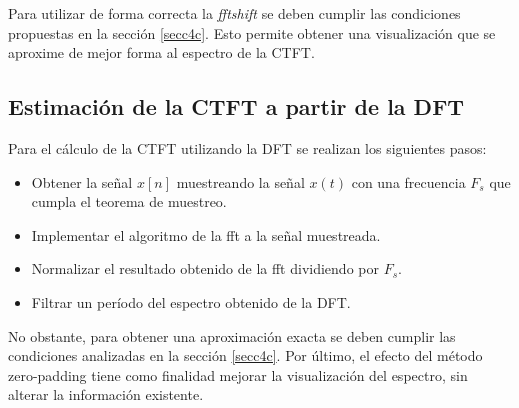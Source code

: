 \documentclass[11pt,a4paper]{article}
\begin{document}
Para utilizar de forma correcta la \textit{fftshift} se deben cumplir las condiciones propuestas en la sección \ref{secc4c}. Esto permite obtener una visualización que se aproxime de mejor 
forma al espectro de la CTFT.


 \subsection{Estimación de la CTFT a partir de la DFT}
 Para el cálculo de la CTFT utilizando la DFT se realizan los siguientes pasos:
 \begin{itemize}
     \item Obtener la señal $x[n]$ muestreando la señal $x(t)$ con una frecuencia $F_s$ que cumpla el teorema de muestreo.
     \item Implementar el algoritmo de la fft a la señal muestreada.
     \item Normalizar el resultado obtenido de la fft dividiendo por $F_s$.
     \item Filtrar un período del espectro obtenido de la DFT.
 \end{itemize}

No obstante, para obtener una aproximación exacta se deben cumplir las condiciones analizadas en la sección \ref{secc4c}.
Por último, el efecto del método zero-padding tiene como finalidad mejorar la visualización del espectro, sin alterar la información existente.
\end{document}
